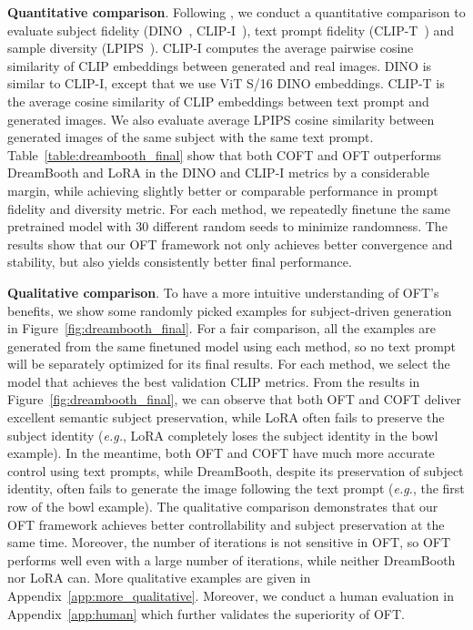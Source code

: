 \documentclass{article}
\newcommand{\eg}{\emph{e.g.}}
\begin{document}
\textbf{Quantitative comparison}. Following \cite{ruiz2023dreambooth}, we conduct a quantitative comparison to evaluate subject fidelity (DINO~\cite{caron2021emerging}, CLIP-I~\cite{radford2021learning}), text prompt fidelity (CLIP-T~\cite{radford2021learning}) and sample diversity (LPIPS~\cite{zhang2018unreasonable}). CLIP-I computes the average pairwise cosine similarity of CLIP embeddings between generated and real images. DINO is similar to CLIP-I, except that we use ViT S/16 DINO embeddings. CLIP-T is the average cosine similarity of CLIP embeddings between text prompt and generated images. We also evaluate average LPIPS cosine similarity between generated images of the same subject with the same text prompt. Table~\ref{table:dreambooth_final} show that both COFT and OFT outperforms DreamBooth and LoRA in the DINO and CLIP-I metrics by a considerable margin, while achieving slightly better or comparable performance in prompt fidelity and diversity metric. For each method, we repeatedly finetune the same pretrained model with 30 different random seeds to minimize randomness. The results show that our OFT framework not only achieves better convergence and stability, but also yields consistently better final performance.




\textbf{Qualitative comparison}. To have a more intuitive understanding of OFT's benefits, we show some randomly picked examples for subject-driven generation in Figure~\ref{fig:dreambooth_final}. For a fair comparison, all the examples are generated from the same finetuned model using each method, so no text prompt will be separately optimized for its final results. For each method, we select the model that achieves the best validation CLIP metrics. From the results in Figure~\ref{fig:dreambooth_final}, we can observe that both OFT and COFT deliver excellent semantic subject preservation, while LoRA often fails to preserve the subject identity (\eg, LoRA completely loses the subject identity in the bowl example). In the meantime, both OFT and COFT have much more accurate control using text prompts, while DreamBooth, despite its preservation of subject identity, often fails to generate the image following the text prompt (\eg, the first row of the bowl example). The qualitative comparison demonstrates that our OFT framework achieves better controllability and subject preservation at the same time. Moreover, the number of iterations is not sensitive in OFT, so OFT performs well even with a large number of iterations, while neither DreamBooth nor LoRA can. More qualitative examples are given in Appendix~\ref{app:more_qualitative}. Moreover, we conduct a human evaluation in Appendix~\ref{app:human} which further validates the superiority of OFT.
\end{document}
